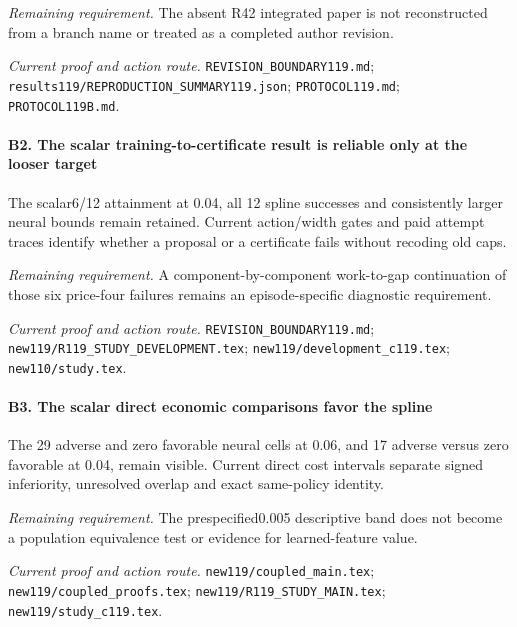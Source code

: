 \par\emph{Remaining requirement.} The absent R42 integrated paper is not reconstructed from a branch name or treated as a completed author revision.

\par\emph{Current proof and action route.} \nolinkurl{REVISION_BOUNDARY119.md}; \nolinkurl{results119/REPRODUCTION_SUMMARY119.json}; \nolinkurl{PROTOCOL119.md}; \nolinkurl{PROTOCOL119B.md}.

\paragraph{B2. The scalar training-to-certificate result is reliable only at the looser target}

The scalar6/12 attainment at 0.04, all 12 spline successes and consistently larger neural bounds remain retained. Current action/\allowbreak{}width gates and paid attempt traces identify whether a proposal or a certificate fails without recoding old caps.

\par\emph{Remaining requirement.} A component-by-component work-to-gap continuation of those six price-four failures remains an episode-specific diagnostic requirement.

\par\emph{Current proof and action route.} \nolinkurl{REVISION_BOUNDARY119.md}; \nolinkurl{new119/R119_STUDY_DEVELOPMENT.tex}; \nolinkurl{new119/development_c119.tex}; \nolinkurl{new110/study.tex}.

\paragraph{B3. The scalar direct economic comparisons favor the spline}

The 29 adverse and zero favorable neural cells at 0.06, and 17 adverse versus zero favorable at 0.04, remain visible. Current direct cost intervals separate signed inferiority, unresolved overlap and exact same-policy identity.

\par\emph{Remaining requirement.} The prespecified0.005 descriptive band does not become a population equivalence test or evidence for learned-feature value.

\par\emph{Current proof and action route.} \nolinkurl{new119/coupled_main.tex}; \nolinkurl{new119/coupled_proofs.tex}; \nolinkurl{new119/R119_STUDY_MAIN.tex}; \nolinkurl{new119/study_c119.tex}.

